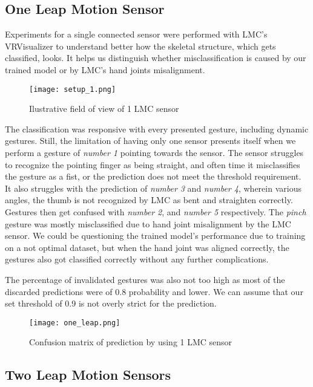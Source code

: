\subsection{One Leap Motion Sensor}

Experiments for a single connected sensor were performed with LMC's VRVisualizer to understand better how the skeletal structure, which gets classified, looks. It helps us distinguish whether misclassification is caused by our trained model or by LMC's hand joints misalignment.

\begin{figure}[ht]
    \centering
    \texttt{[image: setup\_1.png]}
    \caption{Ilustrative field of view of 1 LMC sensor}
    \label{fig:setup_1}
\end{figure}


The classification was responsive with every presented gesture, including dynamic gestures. Still, the limitation of having only one sensor presents itself when we perform a gesture of \textit{number 1} pointing towards the sensor. The sensor struggles to recognize the pointing finger as being straight, and often time it misclassifies the gesture as a fist, or the prediction does not meet the threshold requirement. It also struggles with the prediction of \textit{number 3} and \textit{number 4}, wherein various angles, the thumb is not recognized by LMC as bent and straighten correctly. Gestures then get confused with \textit{number 2}, and \textit{number 5} respectively. The \textit{pinch} gesture was mostly misclassified due to hand joint misalignment by the LMC sensor. We could be questioning the trained model's performance due to training on a not optimal dataset, but when the hand joint was aligned correctly, the gestures also got classified correctly without any further complications.

The percentage of invalidated gestures was also not too high as most of the discarded predictions were of 0.8 probability and lower. We can assume that our set threshold of 0.9 is not overly strict for the prediction.

\begin{figure}[ht]
    \centering
    \texttt{[image: one\_leap.png]}
    \caption{Confusion matrix of prediction by using 1 LMC sensor}
    \label{fig:confuse_1}
\end{figure}


\subsection{Two Leap Motion Sensors}

